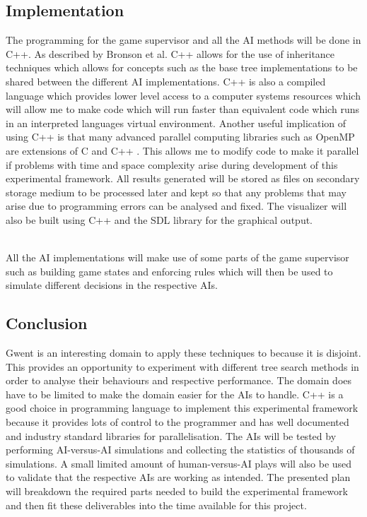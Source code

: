 \documentclass [11pt]{article}
\begin{document}
	\subsection{Implementation}
	The programming for the game supervisor and all the AI methods will be done in C++. As described by Bronson et al. \cite{bronson2012c++} C++ allows for the use of inheritance techniques which allows for concepts such as the base tree implementations to be shared between the different AI implementations. C++ is also a compiled language which provides lower level access to a computer systems resources which will allow me to make code which will run faster than equivalent code which runs in an interpreted languages virtual environment. Another useful implication of using C++ is that many advanced parallel computing libraries such as OpenMP are extensions of C and C++ \cite{parallel}. This allows me to modify code to make it parallel if problems with time and space complexity arise during development of this experimental framework. All results generated will be stored as files on secondary storage medium to be processed later and kept so that any problems that may arise due to programming errors can be analysed and fixed. The visualizer will also be built using C++ and the SDL library for the graphical output.\\\
	
	\noindent All the AI implementations will make use of some parts of the game supervisor such as building game states and enforcing rules which will then be used to simulate different decisions in the respective AIs.  
	
	\subsection{Conclusion}
	Gwent is an interesting domain to apply these techniques to because it is disjoint. This provides an opportunity to experiment with different tree search methods in order to analyse their behaviours and respective performance. The domain does have to be limited to make the domain easier for the AIs to handle. C++ is a good choice in programming language to implement this experimental framework because it provides lots of control to the programmer and has well documented and industry standard libraries for parallelisation. The AIs will be tested by performing AI-versus-AI simulations and collecting the statistics of thousands of simulations. A small limited amount of human-versus-AI plays will also be used to validate that the respective AIs are working as intended. The presented plan will breakdown the required parts needed to build the experimental framework and then fit these deliverables into the time available for this project.
	
\end{document}
